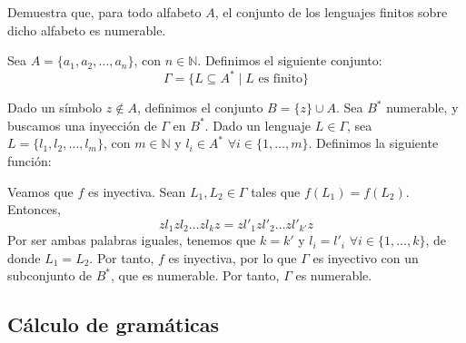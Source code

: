 \begin{ejercicio}
    Demuestra que, para todo alfabeto $A$, el conjunto de los lenguajes finitos sobre dicho alfabeto es numerable.

    Sea $A=\{a_1, a_2, \ldots, a_n\}$, con $n\in \mathbb{N}$. Definimos el siguiente conjunto:
    \begin{equation*}
        \Gamma = \{L\subseteq A^{\ast} \mid L \text{ es finito}\}
    \end{equation*}

    Dado un símbolo $z\notin A$, definimos el conjunto $B=\{z\}\cup A$. Sea $B^{\ast}$ numerable, y buscamos una inyección de $\Gamma$ en $B^{\ast}$.
    Dado un lenguaje $L\in \Gamma$, sea $L=\{l_1, l_2, \ldots, l_m\}$, con $m\in \mathbb{N}$ y $l_i\in A^{\ast}$ $\forall i\in \{1, \ldots, m\}$. Definimos la siguiente función:

    Veamos que $f$ es inyectiva. Sean $L_1, L_2\in \Gamma$ tales que $f(L_1)=f(L_2)$. Entonces,
    \begin{equation*}
        zl_1zl_2\ldots zl_kz = zl'_1zl'_2\ldots zl'_{k'}z
    \end{equation*}
    Por ser ambas palabras iguales, tenemos que $k=k'$ y $l_i=l'_i$ $\forall i\in \{1, \ldots, k\}$, de donde $L_1=L_2$. Por tanto, $f$ es inyectiva, por lo que $\Gamma$ es inyectivo con un subconjunto de $B^{\ast}$, que es numerable. Por tanto, $\Gamma$ es numerable.
\end{ejercicio}




\subsection{Cálculo de gramáticas}

